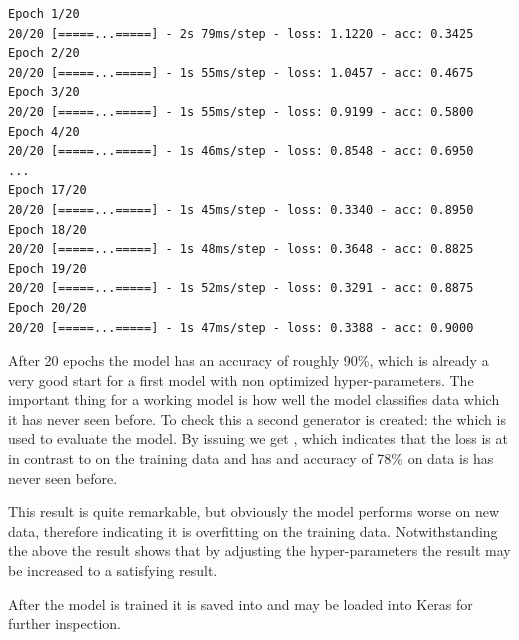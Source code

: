\begin{lstlisting}
Epoch 1/20
20/20 [=====...=====] - 2s 79ms/step - loss: 1.1220 - acc: 0.3425
Epoch 2/20
20/20 [=====...=====] - 1s 55ms/step - loss: 1.0457 - acc: 0.4675
Epoch 3/20
20/20 [=====...=====] - 1s 55ms/step - loss: 0.9199 - acc: 0.5800
Epoch 4/20
20/20 [=====...=====] - 1s 46ms/step - loss: 0.8548 - acc: 0.6950
...
Epoch 17/20
20/20 [=====...=====] - 1s 45ms/step - loss: 0.3340 - acc: 0.8950
Epoch 18/20
20/20 [=====...=====] - 1s 48ms/step - loss: 0.3648 - acc: 0.8825
Epoch 19/20
20/20 [=====...=====] - 1s 52ms/step - loss: 0.3291 - acc: 0.8875
Epoch 20/20
20/20 [=====...=====] - 1s 47ms/step - loss: 0.3388 - acc: 0.9000
\end{lstlisting}

After 20 epochs the model has an accuracy of roughly 90\%, which is already a very good start for a first model with non optimized hyper-parameters.
The important thing for a working model is how well the model classifies data which it has never seen before.
To check this a second generator is created: the  which is used to evaluate the model.
By issuing  we get \code{[0.6071663084129493, 0.7866667]}, which indicates that the loss is at  in contrast to  on the training data and has and accuracy of 78\% on data is has never seen before.

This result is quite remarkable, but obviously the model performs worse on new data, therefore indicating it is overfitting on the training data.
Notwithstanding the above the result shows that by adjusting the hyper-parameters the result may be increased to a satisfying result.

After the model is trained it is saved into  and may be loaded into Keras for further inspection.